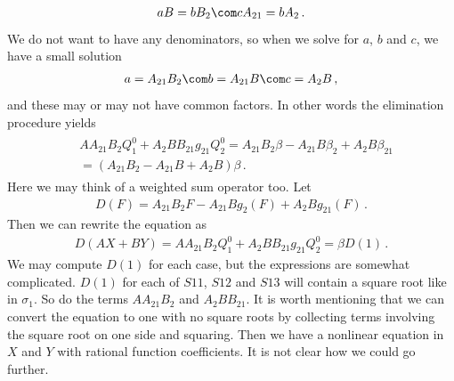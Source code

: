 \begin{align}
	aB = bB_2\com cA_{21} = b A_2\,.
\end{align}
We do not want to have any denominators, so when we solve for $a$, $b$ and $c$, we have a small solution
\begin{align}
	a = A_{21}B_2\com b= A_{21}B\com c = A_2B\,,
\end{align}
and these may or may not have common factors. In other words the elimination procedure yields
\begin{align}
\begin{split}
	&AA_{21}B_2 Q_1^{0} + A_2BB_{21}g_{21}Q_2^{0} =A_{21}B_2\beta-A_{21}B \beta_2 + A_2 B \beta_{21}\\
	&=(A_{21}B_2-A_{21}B+A_2B)\beta \,.
\end{split}	
\end{align}
Here we may think of a weighted sum operator too. Let
\begin{align}
	D(F) = A_{21}B_2 F - A_{21}B g_2(F) + A_2B g_{21}(F) \,.
\end{align}
Then we can rewrite the equation as
\begin{align}
	D(AX+BY) = AA_{21}B_2 Q_1^{0} + A_2BB_{21}g_{21}Q_2^{0} = \beta D(1)\,.
\end{align}
We may compute $D(1)$ for each case, but the expressions are somewhat complicated. $D(1)$ for each of $S11$, $S12$ and $S13$ will contain a square root like in $\sigma_1$. So do the terms $AA_{21}B_2$ and $A_2BB_{21}$. It is worth mentioning that we can convert the equation to one with no square roots by collecting terms involving the square root on one side and squaring. Then we have a nonlinear equation in $X$ and $Y$ with rational function coefficients. It is not clear how we could go further.
